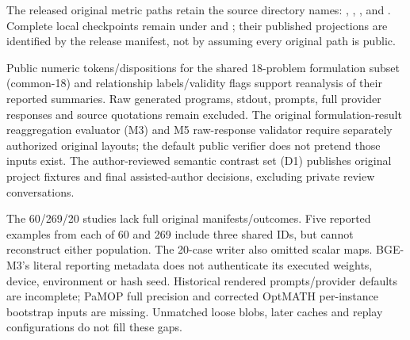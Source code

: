 The released original metric paths retain the source directory names: , , ,  and . Complete local checkpoints remain under  and ; their published projections are identified by the release manifest, not by assuming every original path is public.

Public numeric tokens/dispositions for the shared 18-problem formulation subset (common-18) and relationship labels/validity flags support reanalysis of their reported summaries. Raw generated programs, stdout, prompts, full provider responses and source quotations remain excluded. The original formulation-result reaggregation evaluator (M3)  and M5 raw-response validator  require separately authorized original layouts; the default public verifier does not pretend those inputs exist. The author-reviewed semantic contrast set (D1) publishes original project fixtures and final assisted-author decisions, excluding private review conversations.

The 60/269/20 studies lack full original manifests/outcomes. Five reported examples from each of 60 and 269 include three shared IDs, but cannot reconstruct either population. The 20-case writer also omitted scalar maps. BGE-M3's literal reporting metadata does not authenticate its executed weights, device, environment or hash seed. Historical rendered prompts/provider defaults are incomplete; PaMOP full precision and corrected OptMATH per-instance bootstrap inputs are missing. Unmatched loose blobs, later caches and replay configurations do not fill these gaps.

